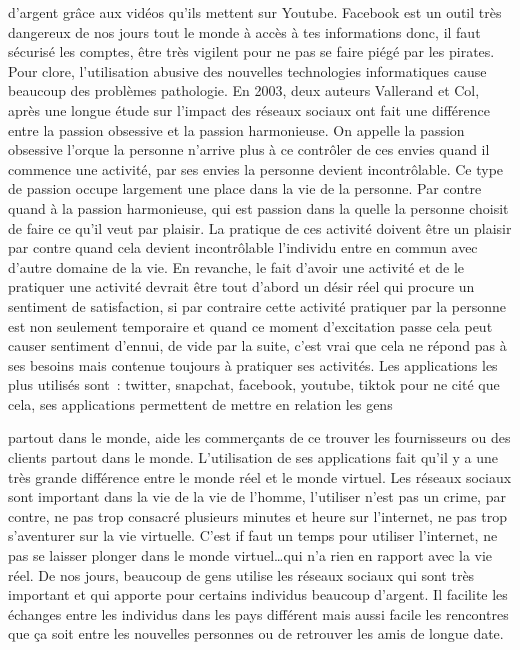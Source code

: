\documentclass[12pt,a4paper,titlepage]{article}
\begin{document}
d’argent grâce aux vidéos qu’ils mettent sur Youtube.
Facebook est un outil très dangereux de nos jours tout le
monde à accès à tes informations donc, il faut sécurisé les
comptes, être très vigilent pour ne pas se faire piégé par les
pirates.
Pour clore, l’utilisation abusive des nouvelles technologies
informatiques cause beaucoup des problèmes pathologie.
En 2003, deux auteurs Vallerand et Col, après une longue
étude sur l’impact des réseaux sociaux ont fait une différence
entre la passion obsessive et la passion harmonieuse.
On appelle la passion obsessive l’orque la personne n’arrive
plus à ce contrôler de ces envies quand il commence une
activité, par ses envies la personne devient incontrôlable. Ce
type de passion occupe largement une place dans la vie de la
personne. Par contre quand à la passion harmonieuse, qui est
passion dans la quelle la personne choisit de faire ce qu’il
veut par plaisir. La pratique de ces activité doivent être un
plaisir par contre quand cela devient incontrôlable l’individu
entre en commun avec d’autre domaine de la vie.
En revanche, le fait d’avoir une activité et de le pratiquer une
activité devrait être tout d’abord un désir réel qui procure un
sentiment de satisfaction, si par contraire cette activité
pratiquer par la personne est non seulement temporaire et
quand ce moment d’excitation passe cela peut causer
sentiment d’ennui, de vide par la suite, c’est vrai que cela ne
répond pas à ses besoins mais contenue toujours à pratiquer
ses activités.
Les applications les plus utilisés sont : twitter, snapchat,
facebook, youtube, tiktok pour ne cité que cela, ses
applications permettent de mettre en relation les gens

partout dans le monde, aide les commerçants de ce trouver
les fournisseurs ou des clients partout dans le monde.
L’utilisation de ses applications fait qu’il y a une très grande
différence entre le monde réel et le monde virtuel. Les
réseaux sociaux sont important dans la vie de la vie de
l’homme, l’utiliser n’est pas un crime, par contre, ne pas trop
consacré plusieurs minutes et heure sur l’internet, ne pas
trop s’aventurer sur la vie virtuelle. C’est if faut un temps
pour utiliser l’internet, ne pas se laisser plonger dans le
monde virtuel…qui n’a rien en rapport avec la vie réel.
De nos jours, beaucoup de gens utilise les réseaux sociaux
qui sont très important et qui apporte pour certains individus
beaucoup d’argent. Il facilite les échanges entre les individus
dans les pays différent mais aussi facile les rencontres que ça
soit entre les nouvelles personnes ou de retrouver les amis de
longue date.
\end{document}
